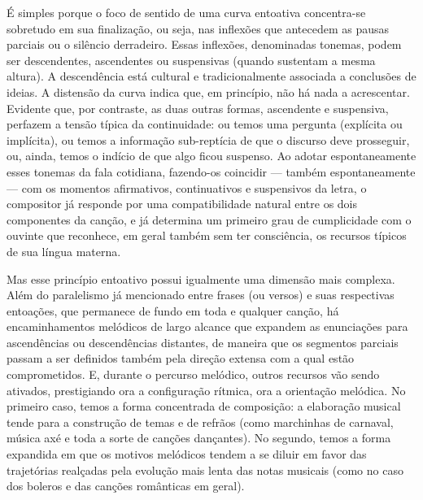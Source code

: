 É simples porque o foco de sentido de uma curva entoativa concentra-se
sobretudo em sua finalização, ou seja, nas inflexões que antecedem as
pausas parciais ou o silêncio derradeiro. Essas inflexões, denominadas
tonemas, podem ser descendentes, ascendentes ou suspensivas (quando
sustentam a mesma altura). A descendência está cultural e
tradicionalmente associada a conclusões de ideias. A distensão da curva
indica que, em princípio, não há nada a acrescentar. Evidente que, por
contraste, as duas outras formas, ascendente e suspensiva, perfazem a
tensão típica da continuidade: ou temos uma pergunta (explícita ou
implícita), ou temos a informação sub-reptícia de que o discurso deve
prosseguir, ou, ainda, temos o indício de que algo ficou suspenso. Ao
adotar espontaneamente esses tonemas da fala cotidiana, fazendo-os
coincidir --- também espontaneamente --- com os momentos afirmativos,
continuativos e suspensivos da letra, o compositor já responde por uma
compatibilidade natural entre os dois componentes da canção, e já
determina um primeiro grau de cumplicidade com o ouvinte que reconhece,
em geral também sem ter consciência, os recursos típicos de sua língua
materna.

Mas esse princípio entoativo possui igualmente uma dimensão mais
complexa. Além do paralelismo já mencionado entre frases (ou versos) e
suas respectivas entoações, que permanece de fundo em toda e qualquer
canção, há encaminhamentos melódicos de largo alcance que expandem as
enunciações para ascendências ou descendências distantes, de maneira que
os segmentos parciais passam a ser definidos também pela direção extensa
com a qual estão comprometidos. E, durante o percurso melódico, outros
recursos vão sendo ativados, prestigiando ora a configuração rítmica,
ora a orientação melódica. No primeiro caso, temos a forma concentrada
de composição: a elaboração musical tende para a construção de temas e
de refrãos (como marchinhas de carnaval, música axé e toda a sorte de
canções dançantes). No segundo, temos a forma expandida em que os
motivos melódicos tendem a se diluir em favor das trajetórias realçadas
pela evolução mais lenta das notas musicais (como no caso dos boleros e
das canções românticas em geral).

